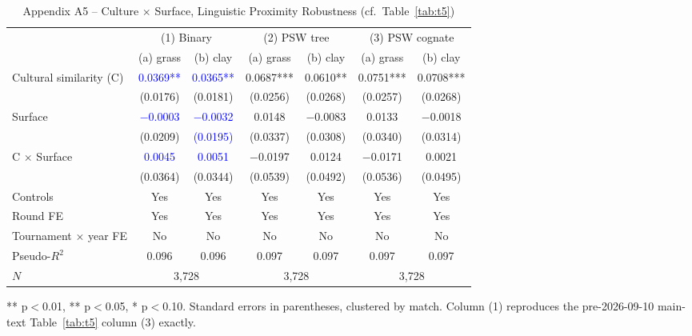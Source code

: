 \documentclass[10pt]{article}
\begin{document}
\begin{table}[htbp]
\centering
\caption{Appendix A5 -- Culture $\times$ Surface, Linguistic Proximity Robustness (cf.\ Table~\ref{tab:t5}) \label{tab:a5}}
\begin{threeparttable}
\begin{tabular}{lcccccc}
\toprule
 & \multicolumn{2}{c}{(1) Binary} & \multicolumn{2}{c}{(2) PSW tree} & \multicolumn{2}{c}{(3) PSW cognate} \\
 & (a) grass & (b) clay & (a) grass & (b) clay & (a) grass & (b) clay \\
\midrule
Cultural similarity (C) & \textcolor{blue}{0.0369**} & \textcolor{blue}{0.0365**} & 0.0687*** & 0.0610** & 0.0751*** & 0.0708*** \\
 & (0.0176) & (0.0181) & (0.0256) & (0.0268) & (0.0257) & (0.0268) \\
Surface & \textcolor{blue}{$-$0.0003} & \textcolor{blue}{$-$0.0032} & 0.0148 & $-$0.0083 & 0.0133 & $-$0.0018 \\
 & (0.0209) & \textcolor{blue}{(0.0195)} & (0.0337) & (0.0308) & (0.0340) & (0.0314) \\
C $\times$ Surface & \textcolor{blue}{0.0045} & \textcolor{blue}{0.0051} & $-$0.0197 & 0.0124 & $-$0.0171 & 0.0021 \\
 & (0.0364) & (0.0344) & (0.0539) & (0.0492) & (0.0536) & (0.0495) \\
\midrule
Controls  & Yes & Yes & Yes & Yes & Yes & Yes \\
Round FE & Yes & Yes & Yes & Yes & Yes & Yes \\
Tournament $\times$ year FE & No & No & No & No & No & No \\
Pseudo-$R^2$ & 0.096 & 0.096 & 0.097 & 0.097 & 0.097 & 0.097 \\
$N$ & \multicolumn{2}{c}{3,728} & \multicolumn{2}{c}{3,728} & \multicolumn{2}{c}{3,728} \\
\bottomrule
\end{tabular}
\begin{tablenotes}
\small
\item *** p$<$0.01, ** p$<$0.05, * p$<$0.10. Standard errors in parentheses, clustered by match. Column (1) reproduces the pre-2026-09-10 main-text Table~\ref{tab:t5} column (3) exactly.
\end{tablenotes}
\end{threeparttable}
\end{table}
\FloatBarrier
\end{document}

